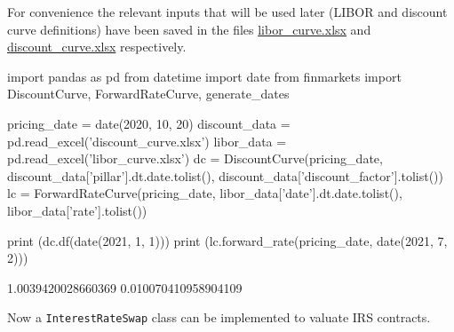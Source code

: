 For convenience the relevant inputs that will be used later (LIBOR and discount curve definitions) have been saved in the files  \href{https://github.com/matteosan1/finance_course/raw/develop/libro/input_files/libor_curve.xlsx}{libor\_curve.xlsx} and \href{https://github.com/matteosan1/finance_course/raw/develop/libro/input_files/discount_curve.xlsx}{discount\_curve.xlsx} respectively.

\begin{ipython}
import pandas as pd
from datetime import date
from finmarkets import DiscountCurve, ForwardRateCurve, generate_dates

pricing_date = date(2020, 10, 20)
discount_data = pd.read_excel('discount_curve.xlsx')
libor_data = pd.read_excel('libor_curve.xlsx')
dc = DiscountCurve(pricing_date,
                   discount_data['pillar'].dt.date.tolist(),
                   discount_data['discount_factor'].tolist())
lc = ForwardRateCurve(pricing_date, 
                      libor_data['date'].dt.date.tolist(),
                      libor_data['rate'].tolist())

print (dc.df(date(2021, 1, 1)))
print (lc.forward_rate(pricing_date, date(2021, 7, 2)))
\end{ipython}
\begin{ioutput}
1.0039420028660369
0.010070410958904109
\end{ioutput}

Now a \texttt{InterestRateSwap} class can be implemented to valuate IRS contracts.

